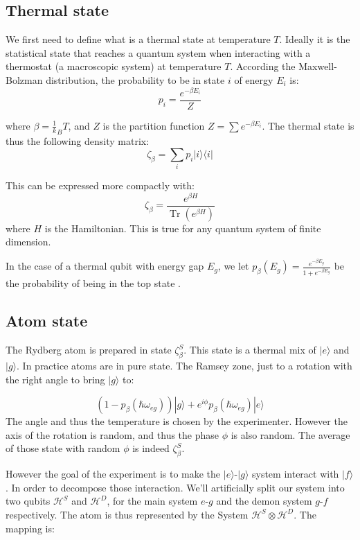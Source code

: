 \documentclass[10pt,a4paper]{report}
\theoremstyle{plain}
\theoremstyle{definition}
\theoremstyle{remark}
\newcommand{\ket}[1]{|#1\rangle}
\newcommand{\bra}[1]{\langle#1|}
\DeclareMathOperator{\Tr}{Tr}
\newcommand{\trnorm}[1]{\frac{#1}{\Tr\left({#1}\right)}}
\begin{document}
\subsection{Thermal state}

We first need to define what is a thermal state at temperature $T$. Ideally it
is the statistical state that
reaches a quantum system when interacting with a thermostat
(a macroscopic system) at temperature $T$. According the Maxwell-Bolzman
distribution, the probability to be in state $i$ of energy $E_i$ is:
\[p_i = \frac {e^{-\beta E_i}} Z\]

where $\beta = \frac 1 k_B T$, and $Z$ is the partition function $Z = \sum
e^{-\beta E_i}$. The thermal state is thus the following density matrix:
\[\zeta_\beta = \sum_i p_i \ket i \bra i\]

This can be expressed more compactly with:
\begin{equation}
  \zeta_\beta = \trnorm{e^{\beta H}}
\end{equation}
where $H$ is the Hamiltonian. This is true for any quantum system of finite dimension.

In the case of a thermal qubit with energy gap $E_g$, we let $p_\beta(E_g) =\frac
{e^{-\beta E_g}}{1 + e^{-\beta E_g}} $ be the probability of being in the top state .

\subsection{Atom state}

The Rydberg atom is prepared in state $\zeta_\beta^S$. This state is a thermal
mix of $\ket e$ and $\ket g$. In practice atoms are in pure state. The Ramsey
zone, just to a rotation with the right angle to bring $\ket g$ to:

\[(1-p_\beta(\hbar \omega_{eg}))\ket g +
e^{i\phi}p_\beta(\hbar \omega_{eg}) \ket e\]
The angle and thus the temperature is chosen by the experimenter. However the
axis of the rotation is random, and thus the phase $\phi$ is also random. The
average of those state with random $\phi$ is indeed $\zeta_\beta^S$.

However the goal of the experiment is to make the $\ket e$-$\ket g$ system
interact with $\ket f$. In order to decompose those interaction. We'll
artificially split our system into two qubits $\mathcal{H}^S$ and $\mathcal{H}^D$, for the
main system $e$-$g$ and the demon system $g$-$f$ respectively. The atom is thus
represented by the System $\mathcal{H}^S \otimes \mathcal{H}^D$. The mapping is:
\end{document}
